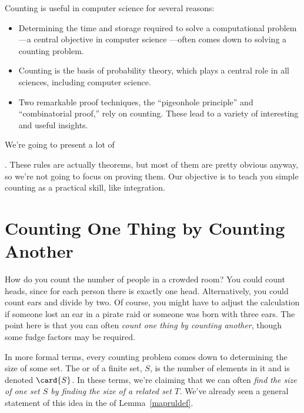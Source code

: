 Counting is useful in computer science for several reasons:

\begin{itemize}

\item Determining the time and storage required to solve a
computational problem ---a central objective in computer science
---often comes down to solving a counting problem.

\item Counting is the basis of probability theory, which plays a central
  role in all sciences, including computer science.

\item Two remarkable proof techniques, the ``pigeonhole principle'' and
  ``combinatorial proof,'' rely on counting.  These lead to a variety of
  interesting and useful insights.

\end{itemize}

We're going to present a lot of .  These rules are actually theorems, but most of them are
pretty obvious anyway, so we're not going to focus on proving them.  Our
objective is to teach you simple counting as a practical skill, like
integration.


\section{Counting One Thing by Counting Another}\label{bijection_counting_sec}

How do you count the number of people in a crowded room?  You could count
heads, since for each person there is exactly one head.  Alternatively,
you could count ears and divide by two.  Of course, you might have to
adjust the calculation if someone lost an ear in a pirate raid or someone
was born with three ears.  The point here is that you can often
\textit{count one thing by counting another}, though some fudge factors
may be required.  \iffalse This is a central theme of counting, from the
easiest problems to the hardest.\fi

In more formal terms, every counting problem comes down to determining the
size of some set.  The  or  of a finite set,
$S$, is the number of elements in it and is denoted  $\card{S}$.  In these terms, we're claiming that we
can often \textit{find the size of one set $S$ by finding the size of a
  related set $T$.}  We've already seen a general statement of this idea
in the  of Lemma~\ref{mapruldef}.


